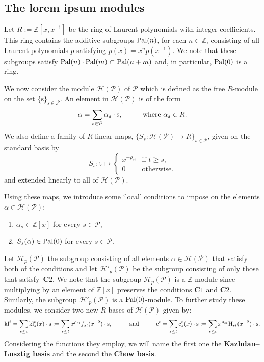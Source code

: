 \documentclass[12pt,letterpaper,english]{amsart}
\theoremstyle{teoremas}
\theoremstyle{definition}
\renewcommand{\H}{\mathrm{H}}
\newcommand{\cH}{\mathcal{H}}
\newcommand{\calP}{\mathcal{P}}
\newcommand{\ZZ}{\mathbb{Z}}
\newcommand{\Ebasis}[1]{\mathrm{#1}}
\newcommand{\Cbasis}[1]{\mathrm{c}^{#1}}
\newcommand{\CbasisSub}[2]{\mathrm{c}^{#1}_{#2}}
\newcommand{\klbasis}[1]{\mathrm{kl}^{#1}}
\newcommand{\klbasisSub}[2]{\mathrm{kl}^{#1}_{#2}}
\newcommand{\pal}{\normalfont\text{Pal}}
\begin{document}
\subsection{The lorem ipsum modules}
Let \(R:=\ZZ[x,x^{-1}]\) be the ring of Laurent polynomials with integer coefficients.
This ring contains the additive subgroups \(\pal(n)\), for each \(n\in\ZZ\),
consisting of all Laurent polynomials
\(p\) satisfying \(p(x)=x^{n}p(x^{-1})\). We note that these subgroups satisfy
\(\pal(n)\cdot\pal(m)\subset \pal(n+m)\) and, in particular, \(\pal(0)\) is a ring.

We now consider the module \(\cH(\calP)\) of \(\calP\)
which is defined as the free \(R\)-module
on the set \(\{\Ebasis{s}\}_{s\in \calP}\). An element in \(\cH(\calP)\) is of the form
\[\alpha = \sum_{s \in \calP}{\alpha_s\cdot \mathrm{s}},\hspace{10mm}\text{where }\alpha_s\in R.\]
We also define a family of \(R\)-linear maps, \(\{S_s:\cH(\calP)\to R\}_{s\in\calP}\), given
on the standard basis by
\[S_s: \mathrm{t}\mapsto \begin{cases}x^{-\rho_{st}} & \text{if } t\geq s, \\ 0 & \text{otherwise}.\end{cases}\]
and extended linearly to all of \(\cH(\calP)\).

Using these maps, we introduce some `local' conditions to impose on the elements
\(\alpha\in\cH(\calP)\):
\begin{enumerate}
    \item[\(\mathbf{C}1\):] \label{cond:p1}
        \(\alpha_s\in\ZZ[x]\) for every \(s\in\calP\),
    \item[\(\mathbf{C}2\):] \label{cond:p2}
        \(S_s(\alpha)\in \pal(0)\) for every \(s\in\calP\).
\end{enumerate}
Let \(\cH_p(\calP)\) the subgroup consisting of all
elements \(\alpha\in \cH(\calP)\) that satisfy both of the conditions
and let \(\cH'_p(\calP)\) be the subgroup consisting of only those
that satisfy~\(\mathbf{C}2\). We note that the subgroup
\(\cH_p(\calP)\) is a \(\ZZ\)-module since multiplying by an element of \(\ZZ[x]\)
preserves the conditions \(\mathbf{C}1\) and \(\mathbf{C}2\).
Similarly, the subgroup
\(\cH'_p(\calP)\) is a \(\pal(0)\)-module. To further study these
modules, we consider two new \(R\)-bases of \(\cH(\calP)\) given by:
\[\klbasis{t} = \sum_{s\leq t}{\klbasisSub{t}{s}(x)\cdot\Ebasis{s}}
    :=\sum_{s\leq t}{x^{\rho_{st}}f_{st}(x^{-2})\cdot\Ebasis{s}},
    \hspace{10mm}\text{and}\hspace{10mm}
    \Cbasis{t}= \sum_{s\leq t}{\CbasisSub{t}{s}(x)\cdot\Ebasis{s}}
    :=\sum_{s\leq t}{x^{\rho_{st}}\H_{st}(x^{-2})\cdot\Ebasis{s}}.
\]
Considering the functions they employ, we will name the first one the \textbf{Kazhdan--Lusztig basis} and the second
the \textbf{Chow basis}.
\end{document}
